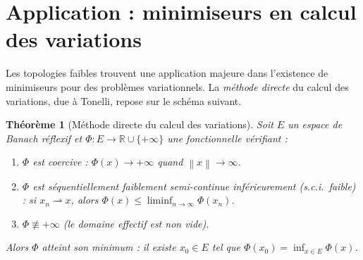 \documentclass[a4paper,12pt]{book}
\newcommand{\R}{\mathbb{R}}
\newcommand{\norm}[1]{\left\| #1 \right\|}
\newcommand{\weakto}{\rightharpoonup}
\theoremstyle{definition}
\theoremstyle{plain}
\newtheorem{theoreme}[definition]{Théorème}
\theoremstyle{remark}
\begin{document}

\section{Application : minimiseurs en calcul des variations}
\label{sec:calcul-variations}


Les topologies faibles trouvent une application majeure dans l'existence de minimiseurs
pour des problèmes variationnels. La \emph{méthode directe}
du calcul des variations, due à Tonelli, repose sur le schéma suivant.

\begin{theoreme}[Méthode directe du calcul des variations]
\label{thm:methode-directe}
Soit $E$ un espace de Banach réflexif et $\Phi : E \to \R \cup \{+\infty\}$ une
fonctionnelle vérifiant :
\begin{enumerate}[label=(\roman*)]
  \item $\Phi$ est \emph{coercive} :
    $\Phi(x) \to +\infty$ quand $\norm{x} \to \infty$.
  \item $\Phi$ est \emph{séquentiellement faiblement semi-continue inférieurement}
    (s.c.i.\ faible) :
    si $x_n \weakto x$, alors $\Phi(x) \le \liminf_{n \to \infty} \Phi(x_n)$.
  \item $\Phi \not\equiv +\infty$ (le domaine effectif est non vide).
\end{enumerate}
Alors $\Phi$ atteint son minimum : il existe $x_0 \in E$ tel que
$\Phi(x_0) = \inf_{x \in E} \Phi(x)$.
\end{theoreme}
\end{document}
